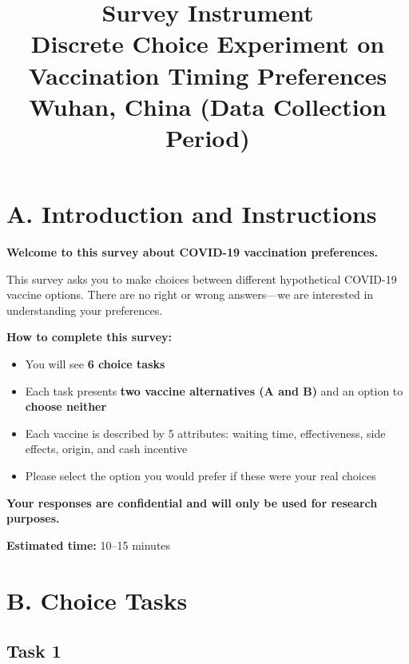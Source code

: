 \documentclass[12pt]{article}
\title{\textbf{Survey Instrument}\\[0.5em]
\large Discrete Choice Experiment on Vaccination Timing Preferences\\
\normalsize Wuhan, China (Data Collection Period)}
\author{}
\date{}
\begin{document}
\maketitle

\section*{A. Introduction and Instructions}

\textbf{Welcome to this survey about COVID-19 vaccination preferences.}

This survey asks you to make choices between different hypothetical COVID-19 vaccine options. There are no right or wrong answers---we are interested in understanding your preferences.

\textbf{How to complete this survey:}
\begin{itemize}
    \item You will see \textbf{6 choice tasks}
    \item Each task presents \textbf{two vaccine alternatives (A and B)} and an option to \textbf{choose neither}
    \item Each vaccine is described by 5 attributes: waiting time, effectiveness, side effects, origin, and cash incentive
    \item Please select the option you would prefer if these were your real choices
\end{itemize}

\textbf{Your responses are confidential and will only be used for research purposes.}

\vspace{1em}
\noindent\textbf{Estimated time:} 10--15 minutes

\newpage

\section*{B. Choice Tasks}

\subsection*{Task 1}
\end{document}
